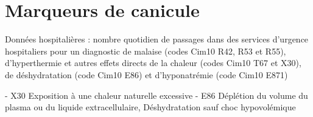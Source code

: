 \documentclass[12pt,english,french,twoside]{book}\usepackage[]{graphicx}\usepackage[]{color}
\begin{document}
\section{Marqueurs de canicule}

Données hospitalières : nombre quotidien de passages dans des services d'urgence hospitaliers pour un diagnostic de malaise (codes Cim10 R42, R53 et R55), d'hyperthermie et autres effets directs de la chaleur (codes Cim10 T67 et X30), de déshydratation (code Cim10 E86) et d'hyponatrémie (code Cim10 E871)

- X30  Exposition à une chaleur naturelle excessive
- E86  Déplétion du volume du plasma ou du liquide extracellulaire, Déshydratation sauf choc hypovolémique
\end{document}
